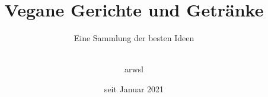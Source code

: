 
\subject{\vspace{2cm}
	\large Rezeptsammlung
	\vspace{1cm}
	}
\title{Vegane Gerichte und Getränke}
\subtitle{Eine Sammlung der besten Ideen}

\author{\vspace{4cm}\\
	arwsl\\
	\vspace{2cm}}

\date{seit Januar 2021}




\maketitle
\thispagestyle{empty}
\cleardoublepage
